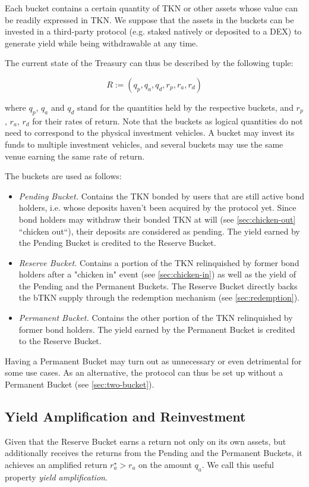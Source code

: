 \documentclass{article}
\begin{document}
Each bucket contains a certain quantity of TKN or other assets whose value can be readily expressed in TKN. We suppose that the assets in the buckets can be invested in a third-party protocol (e.g. staked natively or deposited to a DEX) to generate yield while being withdrawable at any time. 

The current state of the Treasury can thus be described by the following tuple:

\begin{equation}
  \label{eq:treasury}
    R:=(q_p, q_a, q_d, r_p, r_a, r_d)
\end{equation}

where $q_p$, $q_a$ and $q_d$ stand for the quantities held by the respective buckets, and $r_p$, $r_a$, $r_d$ for their rates of return. Note that the buckets as logical quantities do not need to correspond to the physical investment vehicles. A bucket may invest its funds to multiple investment vehicles, and several buckets may use the same venue earning the same rate of return.

The buckets are used as follows:
\begin{itemize}
    \item \textit{Pending Bucket.} Contains the TKN bonded by users that are still active bond holders, i.e. whose deposits haven’t been acquired by the protocol yet. Since bond holders may withdraw their bonded TKN at will (see \ref{sec:chicken-out} “chicken out“), their deposits are considered as pending. The yield earned by the Pending Bucket is credited to the Reserve Bucket.
    \item \textit{Reserve Bucket.} Contains a portion of the TKN relinquished by former bond holders after a "chicken in" event (see \ref{sec:chicken-in}) as well as the yield of the Pending and the Permanent Buckets. The Reserve Bucket directly backs the bTKN supply through the redemption mechanism (see \ref{sec:redemption}).
    \item \textit{Permanent Bucket.} Contains the other portion of the TKN relinquished by former bond holders. The yield earned by the Permanent Bucket is credited to the Reserve Bucket.
\end{itemize}

Having a Permanent Bucket may turn out as unnecessary or even detrimental for some use cases. As an alternative, the protocol can thus be set up without a Permanent Bucket (see \ref{sec:two-bucket}).

\subsection{Yield Amplification and Reinvestment}
Given that the Reserve Bucket earns a return not only on its own assets, but additionally receives the returns from the Pending and the Permanent Buckets, it achieves an amplified return $r_a^\star > r_a$ on the amount $q_a$. We call this useful property \textit{yield amplification}.
\end{document}
